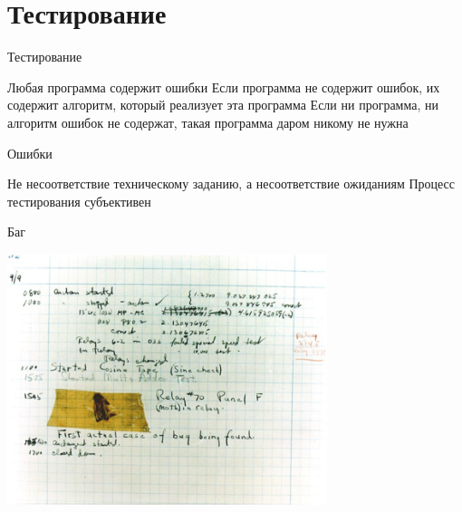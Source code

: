 \documentclass{../../slides-style}
\begin{document}
    \begin{frame}[plain]
        \titlepage
    \end{frame}

    \section{Тестирование}

    \begin{frame}{Тестирование}
        \begin{outline}
            \1 Любая программа содержит ошибки
            \1 Если программа не содержит ошибок, их содержит алгоритм, который реализует эта программа
            \1 Если ни программа, ни алгоритм ошибок не содержат, такая программа даром никому не нужна
        \end{outline}
    \end{frame}

    \begin{frame}{Ошибки}
        \begin{outline}
            \1 Не несоответствие техническому заданию, а несоответствие ожиданиям
            \1 Процесс тестирования субъективен
        \end{outline}
    \end{frame}

    \begin{frame}{Баг}
        \begin{center}
            \includegraphics[width=0.7\textwidth]{bug.png}
        \end{center}
    \end{frame}
\end{document}
